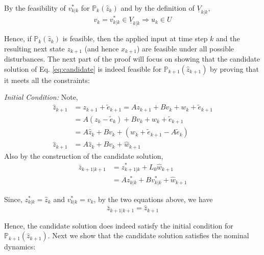 By the feasibility of $v^{*}_{k|k}$ for $\mathbb{P}_{k}(\hat{z}_k)$ and by the definition of $\underline{V}_{k|k}$,
\begin{equation}
v_k = v^{*}_{k|k} \in \underline{V}_{k|k} \Rightarrow u_k \in U
\end{equation}

Hence, if $\mathbb{P}_{k}(\hat{z}_k)$ is feasible, then the applied input at time step $k$ and the resulting next state $z_{k+1}$ (and hence $x_{k+1}$) are feasible under all possible disturbances. 
The next part of the proof will focus on showing that the candidate solution of Eq. \ref{eq:candidate} is indeed feasible for $\mathbb{P}_{k+1}(\hat{z}_{k+1})$ by proving that it meets all the constraints:

\textit{Initial Condition:} Note,
\begin{subequations}
\begin{align}
\hat{z}_{k+1} &= z_{k+1} + \tilde{e}_{k+1} = Az_{k+1} + Bv_k +w_k +\tilde{e}_{k+1} \\
&= A(z_k-\tilde{e}_k) + Bv_k + w_k +\tilde{e}_{k+1} \\
&= A\hat{z}_k + Bv_k + (w_k + \tilde{e}_{k+1} -A\tilde{e}_k)  \\
\hat{z}_{k+1}&=A\hat{z}_k + Bv_k + \hat{w}_{k+1}
\end{align}
\end{subequations}
Also by the construction of the candidate solution,
\begin{subequations}
\begin{align}
\bar{z}_{k+1|k+1} &= z^{*}_{k+1|k} + L_0 \hat{w}_{k+1} \\
&= Az^{*}_{k|k} + Bv^{*}_{k|k} + \hat{w}_{k+1}
\end{align}
\end{subequations}

Since, $z^{*}_{k|k}=\hat{z}_k$ and $v^{*}_{k|k} = v_k$, by the two equations above, we have
\begin{equation}
\bar{z}_{k+1|k+1} = \hat{z}_{k+1}
\end{equation}

Hence, the candidate solution does indeed satisfy the initial condition for $\mathbb{P}_{k+1}(\hat{z}_{k+1})$. Next we show that the candidate solution satisfies the nominal dynamics:

